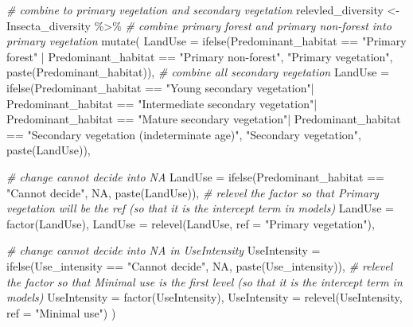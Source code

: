 \documentclass[
]{article}
\newenvironment{Shaded}{\begin{snugshade}}{\end{snugshade}}
\newcommand{\AttributeTok}[1]{\textcolor[rgb]{0.77,0.63,0.00}{#1}}
\newcommand{\CommentTok}[1]{\textcolor[rgb]{0.56,0.35,0.01}{\textit{#1}}}
\newcommand{\ConstantTok}[1]{\textcolor[rgb]{0.00,0.00,0.00}{#1}}
\newcommand{\FunctionTok}[1]{\textcolor[rgb]{0.00,0.00,0.00}{#1}}
\newcommand{\NormalTok}[1]{#1}
\newcommand{\OtherTok}[1]{\textcolor[rgb]{0.56,0.35,0.01}{#1}}
\newcommand{\SpecialCharTok}[1]{\textcolor[rgb]{0.00,0.00,0.00}{#1}}
\newcommand{\StringTok}[1]{\textcolor[rgb]{0.31,0.60,0.02}{#1}}
\begin{document}
\begin{Shaded}
\begin{Highlighting}[]
\CommentTok{\# combine to primary vegetation and secondary vegetation}
\NormalTok{relevled\_diversity }\OtherTok{\textless{}{-}}\NormalTok{ Insecta\_diversity }\SpecialCharTok{\%\textgreater{}\%}
     \CommentTok{\# combine primary forest and primary non{-}forest into primary vegetation}
  \FunctionTok{mutate}\NormalTok{(}
    \AttributeTok{LandUse =} \FunctionTok{ifelse}\NormalTok{(Predominant\_habitat }\SpecialCharTok{==} \StringTok{"Primary forest"} \SpecialCharTok{|}
\NormalTok{                       Predominant\_habitat }\SpecialCharTok{==} \StringTok{"Primary non{-}forest"}\NormalTok{,}
                     \StringTok{"Primary vegetation"}\NormalTok{,}
                     \FunctionTok{paste}\NormalTok{(Predominant\_habitat)),}
    \CommentTok{\# combine all secondary vegetation}
    \AttributeTok{LandUse =} \FunctionTok{ifelse}\NormalTok{(Predominant\_habitat }\SpecialCharTok{==} \StringTok{"Young secondary vegetation"}\SpecialCharTok{|}
\NormalTok{                       Predominant\_habitat }\SpecialCharTok{==} \StringTok{"Intermediate secondary vegetation"}\SpecialCharTok{|}
\NormalTok{                       Predominant\_habitat }\SpecialCharTok{==} \StringTok{"Mature secondary vegetation"}\SpecialCharTok{|}
\NormalTok{                       Predominant\_habitat }\SpecialCharTok{==} \StringTok{"Secondary vegetation (indeterminate age)"}\NormalTok{,}
                     \StringTok{"Secondary vegetation"}\NormalTok{,}
                     \FunctionTok{paste}\NormalTok{(LandUse)),}
    
    \CommentTok{\# change cannot decide into NA}
    \AttributeTok{LandUse =} \FunctionTok{ifelse}\NormalTok{(Predominant\_habitat }\SpecialCharTok{==} \StringTok{"Cannot decide"}\NormalTok{,}
                     \ConstantTok{NA}\NormalTok{, }
                     \FunctionTok{paste}\NormalTok{(LandUse)),}
    \CommentTok{\# relevel the factor so that Primary vegetation will be the ref (so that it is the intercept term in models)}
    \AttributeTok{LandUse =} \FunctionTok{factor}\NormalTok{(LandUse),}
    \AttributeTok{LandUse =} \FunctionTok{relevel}\NormalTok{(LandUse, }\AttributeTok{ref =} \StringTok{"Primary vegetation"}\NormalTok{),}
    
    \CommentTok{\# change cannot decide into NA in UseIntensity}
    \AttributeTok{UseIntensity =} \FunctionTok{ifelse}\NormalTok{(Use\_intensity }\SpecialCharTok{==} \StringTok{"Cannot decide"}\NormalTok{,}
                          \ConstantTok{NA}\NormalTok{,}
                          \FunctionTok{paste}\NormalTok{(Use\_intensity)),}
    \CommentTok{\# relevel the factor so that Minimal use is the first level (so that it is the intercept term in models)}
    \AttributeTok{UseIntensity =} \FunctionTok{factor}\NormalTok{(UseIntensity),}
    \AttributeTok{UseIntensity =} \FunctionTok{relevel}\NormalTok{(UseIntensity, }\AttributeTok{ref =} \StringTok{"Minimal use"}\NormalTok{)}
\NormalTok{  )}


\end{Highlighting}
\end{Shaded}
\end{document}
